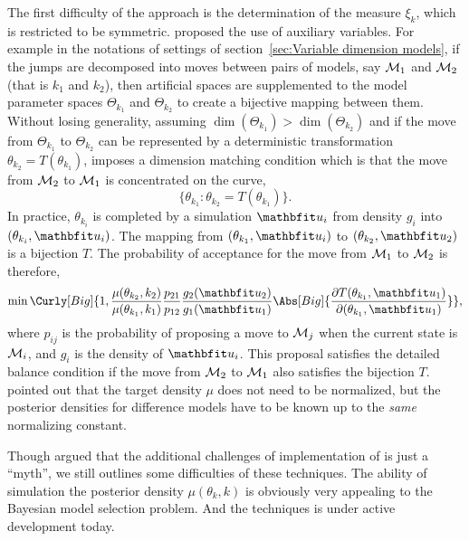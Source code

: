 The first difficulty of the \rjmcmc approach is the determination of the
measure $\xi_k$, which is restricted to be symmetric. \textcite{Green:1995dg}
proposed the use of auxiliary variables. For example in the notations of
settings of section~\ref{sec:Variable dimension models}, if the jumps are
decomposed into moves between pairs of models, say $\mathcal{M}_1$ and $\mathcal{M}_2$
(that is $k_1$ and $k_2$), then artificial spaces are supplemented to
the model parameter spaces $\Theta_{k_1}$ and $\Theta_{k_2}$ to create a bijective
mapping between them. Without losing generality, assuming $\dim(\Theta_{k_1}) >
\dim(\Theta_{k_2})$ and if the move from $\Theta_{k_1}$ to $\Theta_{k_2}$ can be
represented by a deterministic transformation $\theta_{k_2}= T(\theta_{k_1})$,
\textcite{Green:1995dg} imposes a dimension matching condition which is that
the move from $\mathcal{M}_2$ to $\mathcal{M}_1$ is concentrated on the curve,
\begin{equation}
  \{\theta_{k_1}:\theta_{k_2}= T(\theta_{k_1})\}.
\end{equation}
In practice, $\theta_{k_i}$ is completed by a simulation $\bfu_i$ from density
$g_i$ into $(\theta_{k_i},\bfu_i)$. The mapping from $(\theta_{k_1},\bfu_i)$ to
$(\theta_{k_2},\bfu_2)$ is a bijection $T$. The probability of acceptance for
the move from $\mathcal{M}_1$ to $\mathcal{M}_2$ is therefore,
\begin{equation}
  \min\Curly[Big]{1,
    \frac{\mu(\theta_{k_2},k_2)}{\mu(\theta_{k_1},k_1)}
    \frac{p_{21}}{p_{12}} \frac{g_2(\bfu_2)}{g_1(\bfu_1)}
    \Abs[Big]{
      \frac{\partial T(\theta_{k_1},\bfu_1)}{\partial (\theta_{k_1},\bfu_1)}}},
\end{equation}
where $p_{ij}$ is the probability of proposing a move to $\mathcal{M}_j$ when the
current state is $\mathcal{M}_i$, and $g_i$ is the density of $\bfu_i$. This
proposal satisfies the detailed balance condition if the move from $\mathcal{M}_2$
to $\mathcal{M}_1$ also satisfies the bijection $T$. \textcite{Green:1995dg} pointed
out that the target density $\mu$ does not need to be normalized, but the
posterior densities for difference models have to be known up to the
\emph{same} normalizing constant.

Though \textcite{Green:2009tr} argued that the additional challenges of
implementation of \rjmcmc is just a ``myth'', we still outlines some
difficulties of these techniques. The ability of simulation the posterior
density $\mu(\theta_k,k)$ is obviously very appealing to the Bayesian
model selection problem. And the \rjmcmc techniques is under active
development today.

